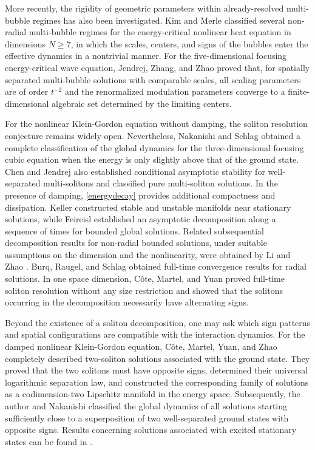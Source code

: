 \documentclass[reqno]{amsart}
\theoremstyle{plain}
\theoremstyle{definition}
\numberwithin{equation}{section}
\begin{document}
More recently, the rigidity of geometric parameters within already-resolved multi-bubble regimes has also been investigated. Kim and Merle \cite{KM2} classified several non-radial multi-bubble regimes for the energy-critical nonlinear heat equation in dimensions $N\geq7$, in which the scales, centers, and signs of the bubbles enter the effective dynamics in a nontrivial manner. For the five-dimensional focusing energy-critical wave equation, Jendrej, Zhang, and Zhao \cite{JZZ} proved that, for spatially separated multi-bubble solutions with comparable scales, all scaling parameters are of order $t^{-2}$ and the renormalized modulation parameters converge to a finite-dimensional algebraic set determined by the limiting centers.


For the nonlinear Klein-Gordon equation without damping, the soliton resolution conjecture remains widely open. Nevertheless, Nakanishi and Schlag \cite{NS} obtained a complete classification of the global dynamics for the three-dimensional focusing cubic equation when the energy is only slightly above that of the ground state. Chen and Jendrej \cite{CJ} also established conditional asymptotic stability for well-separated multi-solitons and classified pure multi-soliton solutions. In the presence of damping, \eqref{energydecay} provides additional compactness and dissipation. Keller \cite{K1} constructed stable and unstable manifolds near stationary solutions, while Feireisl \cite{F} established an asymptotic decomposition along a sequence of times for bounded global solutions. Related subsequential decomposition results for non-radial bounded solutions, under suitable assumptions on the dimension and the nonlinearity, were obtained by Li and Zhao \cite{LZ}. Burq, Raugel, and Schlag \cite{BRS} obtained full-time convergence results for radial solutions. In one space dimension, C\^{o}te, Martel, and Yuan \cite{CMY} proved full-time soliton resolution without any size restriction and showed that the solitons occurring in the decomposition necessarily have alternating signs.


Beyond the existence of a soliton decomposition, one may ask which sign patterns and spatial configurations are compatible with the interaction dynamics. For the damped nonlinear Klein-Gordon equation, C\^{o}te, Martel, Yuan, and Zhao \cite{CMYZ} completely described two-soliton solutions associated with the ground state. They proved that the two solitons must have opposite signs, determined their universal logarithmic separation law, and constructed the corresponding family of solutions as a codimension-two Lipschitz manifold in the energy space. Subsequently, the author and Nakanishi \cite{IN} classified the global dynamics of all solutions starting sufficiently close to a superposition of two well-separated ground states with opposite signs. Results concerning solutions associated with excited stationary states can be found in \cite{CY}.
\end{document}

